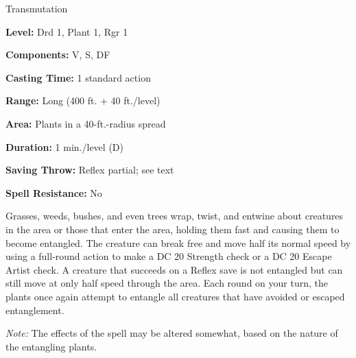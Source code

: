 
Transmutation

\textbf{Level:} Drd 1, Plant 1, Rgr 1

\textbf{Components:} V, S, DF

\textbf{Casting Time:} 1 standard action

\textbf{Range:} Long (400 ft. + 40 ft./level)

\textbf{Area:} Plants in a 40-ft.-radius spread

\textbf{Duration:} 1 min./level (D)

\textbf{Saving Throw:} Reflex partial; see text

\textbf{Spell Resistance:} No

Grasses, weeds, bushes, and even trees wrap, twist, and entwine about creatures 
in the area or those that enter the area, holding them fast and causing them to 
become entangled. The creature can break free and move half its normal speed by 
using a full-round action to make a DC 20 Strength check or a DC 20 Escape Artist 
check. A creature that succeeds on a Reflex save is not entangled but can still 
move at only half speed through the area. Each round on your turn, the plants once 
again attempt to entangle all creatures that have avoided or escaped entanglement.

\textit{Note:} The effects of the spell may be altered somewhat, based on the nature 
of the entangling plants.

